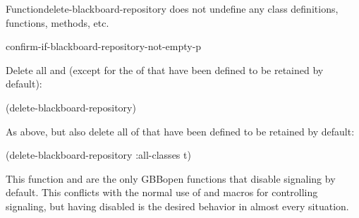\documentclass[10pt,twoside,english,pdftex]{article}
\begin{document}
\begin{functiondoc}{Function}{delete-blackboard-repository}
 does not undefine any class
definitions, functions, methods, etc.

\begin{alsos}{confirm-if-blackboard-repository-not-empty-p}
\end{alsos}

\fnexamples 

Delete all  and 
(except for the  of  that have been
defined to be retained by default):
%
\W\supp
\begin{example}
  (delete-blackboard-repository)
\end{example}
%
As above, but also delete all  of 
that have been defined to be retained by default:
%
\W\supp\notpretop
\begin{example}
  (delete-blackboard-repository :all-classes t)
\end{example}

\fnnote 
%
%
%
%
This function and  are the only GBBopen
functions that disable  signaling by default.  This conflicts
with the normal use of  and
 macros for controlling
 signaling, but having  disabled is the desired
behavior in almost every  situation.

\end{functiondoc}

\end{document}
